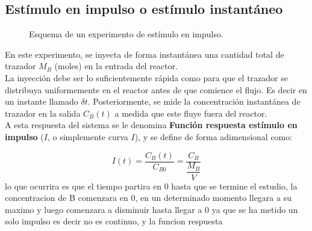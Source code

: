 \subsection{Estímulo en impulso o estímulo instantáneo}
\begin{figure}[htbp]
    \centering
    \caption{Esquema de un experimento de estímulo en impulso.}
    \label{fig:experimento_estimulo_impulso}
\end{figure}
\begin{flushleft}
    En este experimento, se inyecta de forma instantánea una cantidad total de trazador $M_B$ (moles) en la entrada del reactor.\\
    La inyección debe ser lo suficientemente rápida como para que el trazador se distribuya uniformemente en el reactor antes de que comience el flujo. Es decir en un instante llamado $\delta t$.
    Posteriormente, se mide la concentración instantánea de trazador en la salida $C_B(t)$ a medida que este fluye fuera del reactor.\\

    A esta respuesta del sistema se le denomina \textbf{Función respuesta estímulo en impulso} ($I$, o simplemente curva $I$), y se define de forma adimensional como:
\end{flushleft}
\begin{equation}
    I(t) = \frac{C_B(t)}{C_{B0}} = \frac{C_B}{\dfrac{M_B}{V}}
\end{equation}
\noindent lo que ocurrira es que el tiempo partira en 0 hasta que se termine el estudio, la concentracion de B comenzara en 0, en un determinado momento llegara a su maximo y luego comenzara a disminuir hasta llegar a 0 ya que se ha metido un solo impulso es decir no es continuo, y la funcion respuesta
